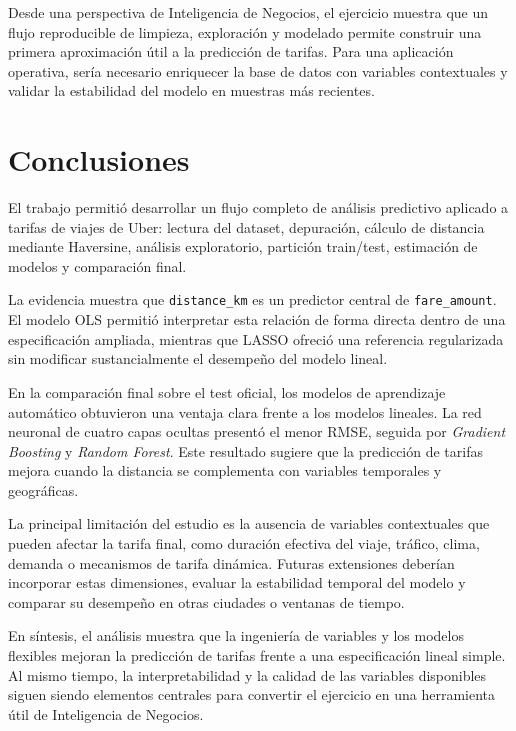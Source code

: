 \documentclass[10pt]{article}
\begin{document}
	Desde una perspectiva de Inteligencia de Negocios, el ejercicio muestra que un flujo reproducible de limpieza, exploración y modelado permite construir una primera aproximación útil a la predicción de tarifas. Para una aplicación operativa, sería necesario enriquecer la base de datos con variables contextuales y validar la estabilidad del modelo en muestras más recientes.

	\section{Conclusiones}

	El trabajo permitió desarrollar un flujo completo de análisis predictivo aplicado a tarifas de viajes de Uber: lectura del dataset, depuración, cálculo de distancia mediante Haversine, análisis exploratorio, partición train/test, estimación de modelos y comparación final.

	La evidencia muestra que \texttt{distance\_km} es un predictor central de \texttt{fare\_amount}. El modelo OLS permitió interpretar esta relación de forma directa dentro de una especificación ampliada, mientras que LASSO ofreció una referencia regularizada sin modificar sustancialmente el desempeño del modelo lineal.

	En la comparación final sobre el test oficial, los modelos de aprendizaje automático obtuvieron una ventaja clara frente a los modelos lineales. La red neuronal de cuatro capas ocultas presentó el menor RMSE, seguida por \textit{Gradient Boosting} y \textit{Random Forest}. Este resultado sugiere que la predicción de tarifas mejora cuando la distancia se complementa con variables temporales y geográficas.

	La principal limitación del estudio es la ausencia de variables contextuales que pueden afectar la tarifa final, como duración efectiva del viaje, tráfico, clima, demanda o mecanismos de tarifa dinámica. Futuras extensiones deberían incorporar estas dimensiones, evaluar la estabilidad temporal del modelo y comparar su desempeño en otras ciudades o ventanas de tiempo.

	En síntesis, el análisis muestra que la ingeniería de variables y los modelos flexibles mejoran la predicción de tarifas frente a una especificación lineal simple. Al mismo tiempo, la interpretabilidad y la calidad de las variables disponibles siguen siendo elementos centrales para convertir el ejercicio en una herramienta útil de Inteligencia de Negocios.
\end{document}
